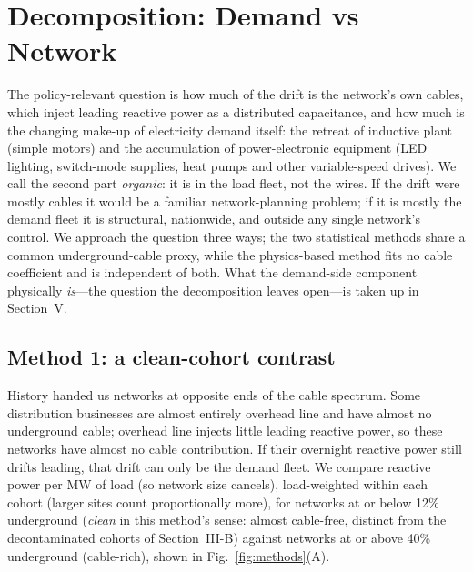 \documentclass[journal]{IEEEtran}
\begin{document}
\section{Decomposition: Demand vs Network}
The policy-relevant question is how much of the drift is the network's own cables,
which inject leading reactive power as a distributed capacitance, and how much is
the changing make-up of electricity demand itself: the retreat of inductive plant
(simple motors) and the accumulation of power-electronic equipment (LED lighting,
switch-mode supplies, heat pumps and other variable-speed drives). We call the
second part \emph{organic}: it is in the load fleet, not the wires. If the drift
were mostly cables it would be a familiar network-planning problem; if it is mostly
the demand fleet it is structural, nationwide, and outside any single network's
control. We approach the question three ways; the two statistical methods share a
common underground-cable proxy, while the physics-based method fits no cable
coefficient and is independent of both. What the demand-side component physically
\emph{is}---the question the decomposition leaves open---is taken up in
Section~V.

\subsection{Method 1: a clean-cohort contrast}
History handed us networks at opposite ends of the cable spectrum. Some
distribution businesses are almost entirely overhead line and have almost no
underground cable; overhead line injects little leading reactive power, so these
networks have almost no cable contribution. If their overnight reactive power still
drifts leading, that drift can only be the demand fleet. We compare reactive power
per MW of load (so network size cancels), load-weighted within each cohort
(larger sites count proportionally more), for
networks at or below 12\% underground (\emph{clean} in this method's sense:
almost cable-free, distinct from the decontaminated cohorts of Section~III-B)
against networks at or above 40\% underground (cable-rich), shown in
Fig.~\ref{fig:methods}(A).
\end{document}
